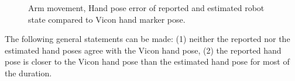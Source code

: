 \begin{figure}[h]
\centering
{}


\caption[Arm movement, hand pose error]{Arm movement, Hand pose error of reported and estimated robot state compared to Vicon hand marker pose.}
\label{fig:vic_error_arm_movement}
\end{figure}

The following general statements can be made: (1) neither the reported nor the estimated hand poses agree with the Vicon hand pose, (2) the reported hand pose is closer to the Vicon hand pose than the estimated hand pose for most of the duration.

